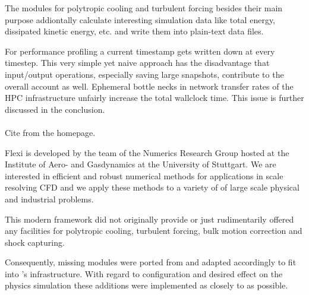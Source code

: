 The modules for polytropic cooling and turbulent forcing besides their main
purpose addiontally calculate interesting simulation data like total energy,
dissipated kinetic energy, etc.  and write them into plain-text data files.

For performance profiling a current timestamp gets written down at every
timestep. This very simple yet naive approach has the disadvantage that
input/output operations, especially saving large snapshots, contribute to the
overall account as well. Ephemeral bottle necks in network transfer rates of
the HPC infrastructure unfairly increase the total wallclock time.  This issue
is further discussed in the conclusion.

\paragraph{\FLEXI}
Cite from the homepage.

Flexi is developed by the team of the Numerics Research Group hosted at the
Institute of Aero- and Gasdynamics at the University of Stuttgart. We are
interested in efficient and robust numerical methods for applications in scale
resolving CFD and we apply these methods to a variety of of large scale
physical and industrial problems.

This modern framework did not originally provide or just rudimentarily offered
any facilities for polytropic cooling, turbulent forcing, bulk motion
correction and shock capturing.

Consequently, missing modules were ported from \FLASH and adapted accordingly
to fit into \FLEXI's infrastructure.  With regard to configuration and desired
effect on the physics simulation these additions were implemented as closely to
\FLASH as possible.
